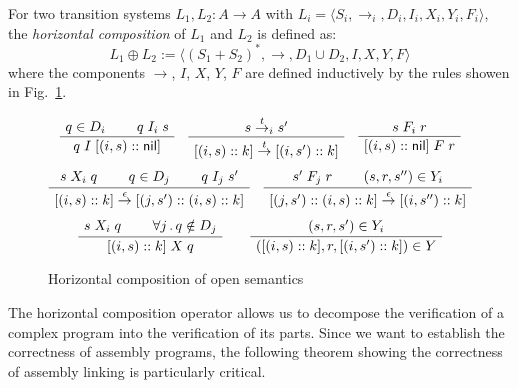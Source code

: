 \documentclass[sigplan,10pt,review,anonymous]{acmart}
\newcommand{\kw}[1]{\ensuremath{ \mathsf{#1} }}
\begin{document}
\begin{definition} \label{def:hcomp} %
For two transition systems $L_1, L_2 : A \rightarrow A$
with
$L_i = \langle S_i, {\rightarrow}_i, D_i, I_i, X_i, Y_i, F_i \rangle$,
the \emph{horizontal composition} of $L_1$ and $L_2$
is defined as:
\[
    L_1 \oplus L_2 :=
    \langle
      (S_1 + S_2)^*, {\rightarrow}, D_1 \cup D_2, I, X, Y, F
    \rangle
\]
where the components $\rightarrow$, $I$, $X$, $Y$, $F$
are defined inductively by
the rules showen in Fig.~\ref{fig:hcomp}.
\end{definition}

\begin{figure} %
    \footnotesize
    \begin{gather*}
        \AxiomC{$q \in D_i$}
        \AxiomC{$q \mathrel{I_i} s$}
        \BinaryInfC{$q \mathrel{I} [(i, s) :: \kw{nil}]$}
        \DisplayProof
        \quad
        \AxiomC{$s \stackrel{t}{\rightarrow}_i s'$}
        \UnaryInfC{$
            [(i, s) :: k]
            \stackrel{t}{\rightarrow}
            [(i, s') :: k]$}
        \DisplayProof
        \quad
        \AxiomC{$s \mathrel{F_i} r$}
        \UnaryInfC{$[(i, s) :: \kw{nil}] \mathrel{F} r$}
        \DisplayProof
        \\[1ex]
        \AxiomC{$s \mathrel{X_i} q$}
        \AxiomC{$q \in D_j$}
        \AxiomC{$q \mathrel{I_j} s'$}
        \TrinaryInfC{$
            [(i, s) :: k]
            \stackrel{\epsilon}{\rightarrow}
            [(j, s') :: (i, s) :: k]$}
        \DisplayProof
        \quad
        \AxiomC{$s' \mathrel{F_j} r$}
        \AxiomC{$(s, r, s'') \in Y_i$}
        \BinaryInfC{$
            [(j, s') :: (i, s) :: k]
            \stackrel{\epsilon}{\rightarrow}
            [(i, s'') :: k]$}
        \DisplayProof
        \\[1ex]
        \AxiomC{$s \mathrel{X_i} q$}
        \AxiomC{$\forall j \,.\, q \notin D_j$}
        \BinaryInfC{$[(i, s) :: k] \mathrel{X} q$}
        \DisplayProof
        \qquad
        \AxiomC{$(s, r, s') \in Y_i$}
        \UnaryInfC{$([(i, s) :: k], r, [(i, s') :: k]) \in Y$}
        \DisplayProof
    \end{gather*}
    \caption{Horizontal composition of open semantics}
    \label{fig:hcomp}
\end{figure}

The horizontal composition operator
allows us to decompose the verification of a complex program
into the verification of its parts.
Since we want to
establish the correctness of assembly programs,
the following theorem showing the correctness
of assembly linking is particularly critical.
\end{document}
